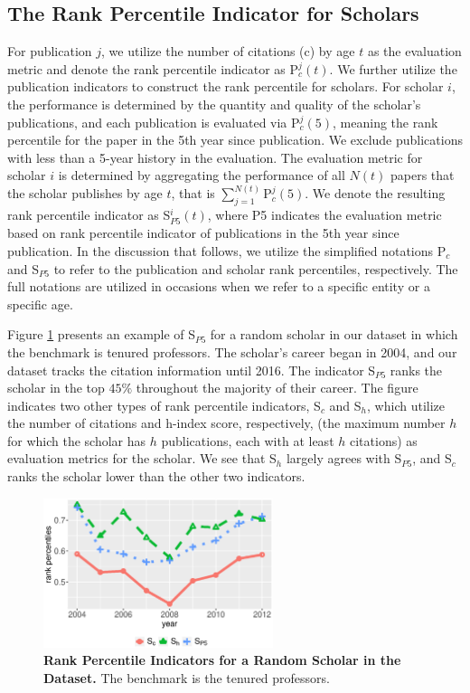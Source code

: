 \subsection*{The Rank Percentile Indicator for Scholars}

For publication $j$, we utilize the number of citations (c) by age $t$ as the evaluation metric and denote the rank percentile indicator as P$_c^{j}(t)$. We further utilize the publication indicators to construct the rank percentile for scholars. For scholar $i$, the performance is determined by the quantity and quality of the scholar's publications, and each publication is evaluated via P$_c^{j}(5)$, meaning the rank percentile for the paper in the 5th year since publication. We exclude publications with less than a 5-year history in the evaluation. The evaluation metric for scholar $i$ is determined by aggregating the performance of all $N(t)$ papers that the scholar publishes by age $t$, that is $\displaystyle \sum_{j=1}^{N(t)} \text{P}_c^{j}(5)$. We denote the resulting rank percentile indicator as S$_{P5}^{i}(t)$, where P5 indicates the evaluation metric based on rank percentile indicator of publications in the 5th year since publication. In the discussion that follows, we utilize the simplified notations P$_c$ and S$_{P5}$ to refer to the publication and scholar rank percentiles, respectively. The full notations are utilized in occasions when we refer to a specific entity or a specific age. 

Figure \ref{fig:auti} presents an example of S$_{P5}$ for a random scholar in our dataset in which the benchmark is tenured professors. The scholar's career began in 2004, and our dataset tracks the citation information until 2016. The indicator S$_{P5}$ ranks the scholar in the top $45\%$ throughout the majority of their career. The figure indicates two other types of rank percentile indicators, S$_c$ and S$_h$, which utilize the number of citations and h-index score, respectively, (the maximum number $h$ for which the scholar has $h$ publications, each with at least $h$ citations) as evaluation metrics for the scholar. We see that S$_h$ largely agrees with S$_{P5}$, and S$_c$ ranks the scholar lower than the other two indicators. 

\begin{figure}[ht!]
    \centering
    \includegraphics[width=0.6\textwidth]{figures/compare_autrp/auti.eps}
    \caption{{\bf Rank Percentile Indicators for a Random Scholar in the Dataset.} 
    The benchmark is the tenured professors.}
    \label{fig:auti}
\end{figure}

